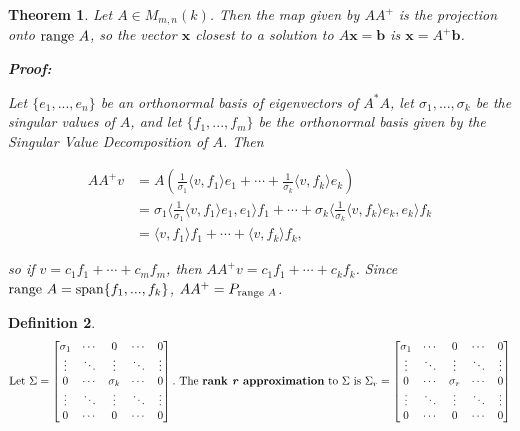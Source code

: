 \documentclass{article}
\theoremstyle{colontheorem}
\newtheorem{theorem}{Theorem}[section]
\newtheorem{definition}[theorem]{Definition}
\newcommand{\Span}{\textnormal{span}}
\newcommand{\Range}{\textnormal{range }}
\newenvironment{Theorem}
{
	\begin{mdframed}[backgroundcolor=TheoremOrange!10]
	\begin{theorem}
}
{
	\end{theorem}
	\end{mdframed}
	
	\vspace{.15in}
}
\newenvironment{Def}
{
	\begin{mdframed}[backgroundcolor=DefGreen!10]
	\begin{definition}
}
{
	\end{definition}
	\end{mdframed}
	
	\vspace{.15in}
}
\newenvironment{Proof}
{
	\begin{mdframed}[backgroundcolor=ProofPurple!10]
	\textbf{Proof:}%
}
{
	\end{mdframed}
	
	\vspace{.085in}
}
\begin{document}
\begin{Theorem}
	
	Let $A \in M_{m, n}(k)$. Then the map given by $AA^+$ is the projection onto $\Range A$, so the vector $\mathbf{x}$ closest to a solution to $A\mathbf{x} = \mathbf{b}$ is $\mathbf{x} = A^+ \mathbf{b}$.
	
	\begin{Proof}
		Let $\{e_1, ..., e_n\}$ be an orthonormal basis of eigenvectors of $A^* A$, let $\sigma_1, ..., \sigma_k$ be the singular values of $A$, and let $\{f_1, ..., f_m\}$ be the orthonormal basis given by the Singular Value Decomposition of $A$. Then
		
		\begin{align*}
			AA^+ v &= A(\frac{1}{\sigma_1} \langle v, f_1 \rangle e_1 + \cdots + \frac{1}{\sigma_k} \langle v, f_k \rangle e_k)\\
			&= \sigma_1 \langle \frac{1}{\sigma_1} \langle v, f_1 \rangle e_1, e_1 \rangle f_1 + \cdots + \sigma_k \langle \frac{1}{\sigma_k} \langle v, f_k \rangle e_k, e_k \rangle f_k\\
			&= \langle v, f_1 \rangle f_1 + \cdots + \langle v, f_k \rangle f_k,
		\end{align*}
		
		so if $v = c_1 f_1 + \cdots + c_m f_m$, then $AA^+ v = c_1 f_1 + \cdots + c_k f_k$. Since $\Range A = \Span \{f_1, ..., f_k\}$, $AA^+ = P_{\Range A}$.
		
	\end{Proof}
	
\end{Theorem}



\begin{Def}
	
	$$\textnormal{Let}\ \Sigma = \begin{bmatrix}
	
	\sigma_1 & \cdots & 0 & \cdots & 0\\
	\vdots & \ddots & \vdots & \ddots & \vdots\\
	0 & \cdots & \sigma_k & \cdots & 0\\
	\vdots & \ddots & \vdots & \ddots & \vdots\\
	0 & \cdots & 0 & \cdots & 0
	
	\end{bmatrix}.\ \textnormal{The \textbf{rank \emph{r} approximation} to}\ \Sigma\ \textnormal{is}\ \Sigma_r = \begin{bmatrix}
	
	\sigma_1 & \cdots & 0 & \cdots & 0\\
	\vdots & \ddots & \vdots & \ddots & \vdots\\
	0 & \cdots & \sigma_r & \cdots & 0\\
	\vdots & \ddots & \vdots & \ddots & \vdots\\
	0 & \cdots & 0 & \cdots & 0
	
	\end{bmatrix}
	$$
	
\end{Def}
\end{document}
